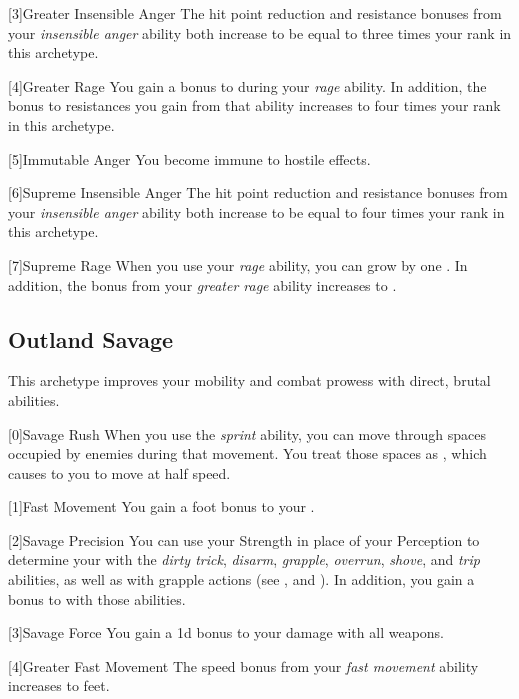         [3]{Greater Insensible Anger} The hit point reduction and resistance bonuses from your \textit{insensible anger} ability both increase to be equal to three times your rank in this archetype.

        [4]{Greater Rage} You gain a  bonus to  during your \textit{rage} ability.
        In addition, the bonus to resistances you gain from that ability increases to four times your rank in this archetype.

        [5]{Immutable Anger} You become immune to hostile  effects.

        [6]{Supreme Insensible Anger} The hit point reduction and resistance bonuses from your \textit{insensible anger} ability both increase to be equal to four times your rank in this archetype.

        [7]{Supreme Rage} When you use your \textit{rage} ability, you can grow by one .
        In addition, the  bonus from your \textit{greater rage} ability increases to .

    \newpage
    \subsection{Outland Savage}
        This archetype improves your mobility and combat prowess with direct, brutal abilities.

        [0]{Savage Rush} When you use the \textit{sprint} ability, you can move through spaces occupied by enemies during that movement.
        You treat those spaces as , which causes to you to move at half speed.

        [1]{Fast Movement} You gain a  foot bonus to your .

        [2]{Savage Precision} You can use your Strength in place of your Perception to determine your  with the \textit{dirty trick}, \textit{disarm}, \textit{grapple}, \textit{overrun}, \textit{shove}, and \textit{trip} abilities, as well as with grapple actions (see , and ).
        In addition, you gain a  bonus to  with those abilities.

        [3]{Savage Force} You gain a \plus1d bonus to your damage with all weapons.

        [4]{Greater Fast Movement} The speed bonus from your \textit{fast movement} ability increases to  feet.

